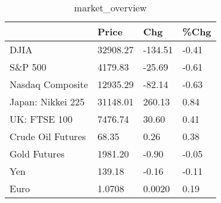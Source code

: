 \documentclass{article}%
\begin{document}
%


\begin{table}[htbp]%
\caption{market\_overview}%
\centering%
\begin{adjustbox}{width=1\textwidth}%
\begin{tabular}{llll}
\toprule
                  &    Price &     Chg &  \%Chg \\
\midrule
             DJIA & 32908.27 & -134.51 & -0.41 \\
          S\&P 500 &  4179.83 &  -25.69 & -0.61 \\
 Nasdaq Composite & 12935.29 &  -82.14 & -0.63 \\
Japan: Nikkei 225 & 31148.01 &  260.13 &  0.84 \\
     UK: FTSE 100 &  7476.74 &   30.60 &  0.41 \\
Crude Oil Futures &    68.35 &    0.26 &  0.38 \\
     Gold Futures &  1981.20 &   -0.90 & -0.05 \\
              Yen &   139.18 &   -0.16 & -0.11 \\
             Euro &   1.0708 &  0.0020 &  0.19 \\
\bottomrule
\end{tabular}
%
\end{adjustbox}%
\end{table}

%
\end{document}
